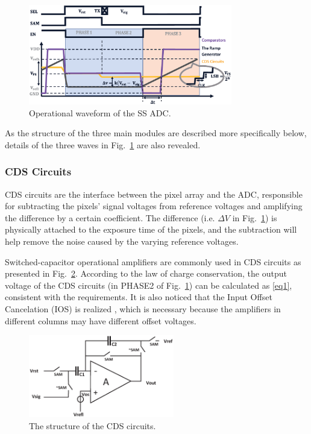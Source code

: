 \begin{figure}[htbp]
	\centerline{\includegraphics[width=3.5in]{./Figures/SSWAVE.eps}}
	\caption{Operational waveform of the SS ADC.}
	\label{SSWAVE}
\end{figure}

As the structure of the three main modules are described more specifically below, details of the three waves in Fig.~\ref{SSWAVE} are also revealed.

\subsubsection{CDS Circuits}

CDS circuits are the interface between the pixel array and the ADC, responsible for subtracting the pixels’ signal voltages from reference voltages and 
amplifying the difference by a certain coefficient. The difference (i.e. $\Delta{V}$ in Fig.~\ref{SSWAVE}) is physically attached to the exposure time of the pixels, 
and the subtraction will help remove the noise caused by the varying reference voltages. 

Switched-capacitor operational amplifiers are commonly used in CDS circuits as presented in Fig.~\ref{CDS}. According to the law of charge conservation, 
the output voltage of the CDS circuits (in PHASE2 of Fig.~\ref{SSWAVE}) can be calculated as \eqref{eq1}, consistent with the requirements. It is also noticed that the Input Offset Cancelation (IOS) is realized \cite{razavi_design_1992}, 
which is necessary because the amplifiers in different columns may have different offset voltages.

\begin{figure}[htbp]
	\centerline{\includegraphics[width=2.5in]{./Figures/CDS.eps}}
	\caption{The structure of the CDS circuits.}
	\label{CDS}
\end{figure} 

